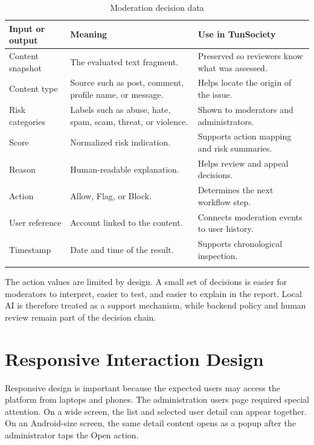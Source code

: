 \begin{longtable}{|m{3.2cm}|m{4.8cm}|m{5.8cm}|}
\hline
\textbf{Input or output} & \textbf{Meaning} & \textbf{Use in TunSociety} \\
\hline
Content snapshot & The evaluated text fragment. & Preserved so reviewers know what was assessed. \\
\hline
Content type & Source such as post, comment, profile name, or message. & Helps locate the origin of the issue. \\
\hline
Risk categories & Labels such as abuse, hate, spam, scam, threat, or violence. & Shown to moderators and administrators. \\
\hline
Score & Normalized risk indication. & Supports action mapping and risk summaries. \\
\hline
Reason & Human-readable explanation. & Helps review and appeal decisions. \\
\hline
Action & Allow, Flag, or Block. & Determines the next workflow step. \\
\hline
User reference & Account linked to the content. & Connects moderation events to user history. \\
\hline
Timestamp & Date and time of the result. & Supports chronological inspection. \\
\hline
\caption{Moderation decision data}
\end{longtable}

The action values are limited by design. A small set of decisions is easier for moderators to interpret, easier to test, and easier to explain in the report. Local AI is therefore treated as a support mechanism, while backend policy and human review remain part of the decision chain.

\section{Responsive Interaction Design}

Responsive design is important because the expected users may access the platform from laptops and phones. The administration users page required special attention. On a wide screen, the list and selected user detail can appear together. On an Android-size screen, the same detail content opens as a popup after the administrator taps the Open action.

